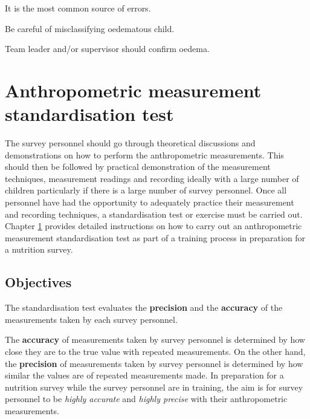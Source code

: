 \documentclass[12pt,]{book}
\theoremstyle{definition}
\theoremstyle{definition}
\theoremstyle{definition}
\theoremstyle{remark}
\begin{document}
\item 

It is the most common source of errors.

\item 

Be careful of misclassifying oedematous child.

\item 

Team leader and/or supervisor should confirm oedema.

\hypertarget{standard}{%
\chapter{Anthropometric measurement standardisation
test}\label{standard}}

The survey personnel should go through theoretical discussions and
demonstrations on how to perform the anthropometric measurements. This
should then be followed by practical demonstration of the measurement
techniques, measurement readings and recording ideally with a large
number of children particularly if there is a large number of survey
personnel. Once all personnel have had the opportunity to adequately
practice their measurement and recording techniques, a standardisation
test or exercise must be carried out. Chapter \ref{standard} provides
detailed instructions on how to carry out an anthropometric measurement
standardisation test as part of a training process in preparation for a
nutrition survey.

\hypertarget{objectives}{%
\section{Objectives}\label{objectives}}

The standardisation test evaluates the \textbf{precision} and the
\textbf{accuracy} of the measurements taken by each survey personnel.

The \textbf{accuracy} of measurements taken by survey personnel is
determined by how close they are to the true value with repeated
measurements. On the other hand, the \textbf{precision} of measurements
taken by survey personnel is determined by how similar the values are of
repeated measurements made. In preparation for a nutrition survey while
the survey personnel are in training, the aim is for survey personnel to
be \emph{highly accurate} and \emph{highly precise} with their
anthropometric measurements.
\end{document}

